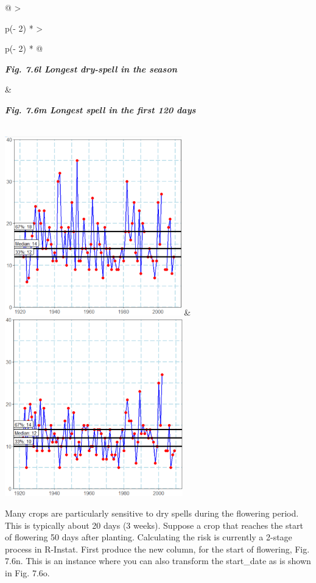 \documentclass[
  letterpaper,
  DIV=11,
  numbers=noendperiod]{scrreprt}
\begin{document}
\begin{longtable}[]{@{}
  >{\raggedright\arraybackslash}p{(\columnwidth - 2\tabcolsep) * }
  >{\raggedright\arraybackslash}p{(\columnwidth - 2\tabcolsep) * }@{}}
\toprule\noalign{}
\begin{minipage}[b]{\linewidth}\raggedright
\textbf{\emph{Fig. 7.6l Longest dry-spell in the season}}
\end{minipage} & \begin{minipage}[b]{\linewidth}\raggedright
\textbf{\emph{Fig. 7.6m Longest spell in the first 120 days}}
\end{minipage} \\
\midrule\noalign{}
\endhead
\bottomrule\noalign{}
\endlastfoot
\includegraphics[width=3.01745in,height=3.05955in]{figures/Fig7.6l.png}
&
\includegraphics[width=3.04182in,height=3.04182in]{figures/Fig7.6m.png} \\
\end{longtable}

Many crops are particularly sensitive to dry spells during the flowering
period. This is typically about 20 days (3 weeks). Suppose a crop that
reaches the start of flowering 50 days after planting. Calculating the
risk is currently a 2-stage process in R-Instat. First produce the new
column, for the start of flowering, Fig. 7.6n. This is an instance where
you can also transform the start\_date as is shown in Fig. 7.6o.
\end{document}

